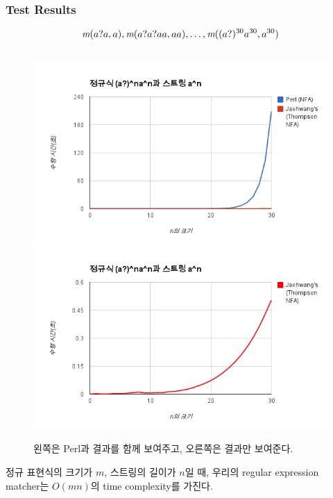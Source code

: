 \begin{frame}
    \frametitle{Test Results}

\[
    \rmatch{a}{a?a},  \rmatch{aa}{a?a?aa}, \dots,
    \rmatch{a^{30}}{(a?)^{30}a^{30}}
\]

\begin{figure}
\begin{columns}[b]
    \column{.5\paperwidth}
        \includegraphics[width=.5\paperwidth]{result-compare.png}
    \column{.5\paperwidth}
        \includegraphics[width=.5\paperwidth]{result-single.png}
\end{columns}
\caption{왼쪽은 Perl과  결과를 함께 보여주고, 오른쪽은 
    결과만 보여준다.}
\end{figure}

정규 표현식의 크기가 $m$, 스트링의 길이가 $n$일 때,
우리의 regular expression matcher는 $O(mn)$의 time complexity를 가진다.

\end{frame}
